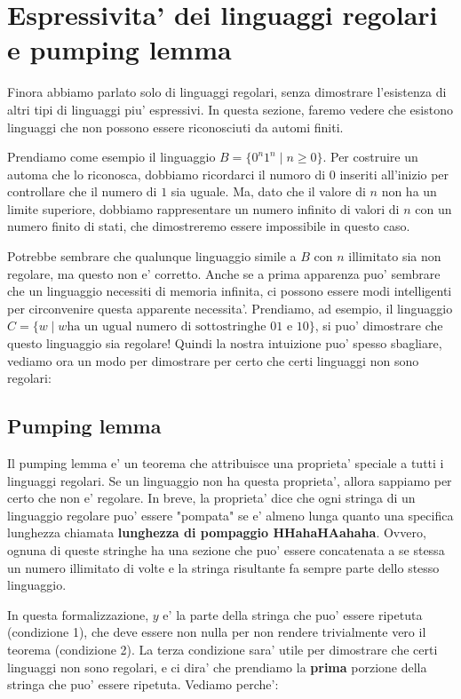 \section{Espressivita' dei linguaggi regolari e pumping lemma}
Finora abbiamo parlato solo di linguaggi regolari, senza dimostrare l'esistenza di altri tipi di linguaggi piu' espressivi. In questa sezione, faremo vedere che esistono linguaggi che non possono essere riconosciuti da automi finiti.

Prendiamo come esempio il linguaggio $ B = \{0^n 1^n \mid n \geq 0\} $. Per costruire un automa che lo riconosca, dobbiamo ricordarci il numoro di $ 0 $ inseriti all'inizio per controllare che il numero di $ 1 $ sia uguale. Ma, dato che il valore di $ n $ non ha un limite superiore, dobbiamo rappresentare un numero infinito di valori di $ n $ con un numero finito di stati, che dimostreremo essere impossibile in questo caso.

Potrebbe sembrare che qualunque linguaggio simile a $ B $ con $ n $ illimitato sia non regolare, ma questo non e' corretto. Anche se a prima apparenza puo' sembrare che un linguaggio necessiti di memoria infinita, ci possono essere modi intelligenti per circonvenire questa apparente necessita'. Prendiamo, ad esempio, il linguaggio $ C = \{w \mid w \text{ha un ugual numero di sottostringhe 01 e 10}\} $, si puo' dimostrare che questo linguaggio sia regolare! Quindi la nostra intuizione puo' spesso sbagliare, vediamo ora un modo per dimostrare per certo che certi linguaggi non sono regolari:

\subsection{Pumping lemma}
Il pumping lemma e' un teorema che attribuisce una proprieta' speciale a tutti i linguaggi regolari. Se un linguaggio non ha questa proprieta', allora sappiamo per certo che non e' regolare. In breve, la proprieta' dice che ogni stringa di un linguaggio regolare puo' essere "pompata" se e' almeno lunga quanto una specifica lunghezza chiamata \textbf{lunghezza di pompaggio HHahaHAahaha}. Ovvero, ognuna di queste stringhe ha una sezione che puo' essere concatenata a se stessa un numero illimitato di volte e la stringa risultante fa sempre parte dello stesso linguaggio. 

In questa formalizzazione, $ y $ e' la parte della stringa che puo' essere ripetuta (condizione 1), che deve essere non nulla per non rendere trivialmente vero il teorema (condizione 2). La terza condizione sara' utile per dimostrare che certi linguaggi non sono regolari, e ci dira' che prendiamo la \textbf{prima} porzione della stringa che puo' essere ripetuta. Vediamo perche':

